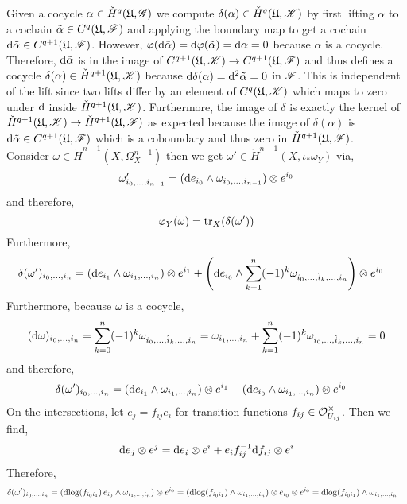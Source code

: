 \documentclass[12pt]{article}
\begin{document}
\begin{enumerate}
Given a cocycle $\alpha \in \check{H}^{q}(\mathfrak{U}, \mathscr{G})$ we compute $\delta(\alpha) \in \check{H}^{q}(\mathfrak{U}, \mathscr{K})$ by first lifting $\alpha$ to a cochain $\tilde{\alpha} \in C^{q}(\mathfrak{U}, \mathscr{F})$ and applying the boundary map to get a cochain $\mathrm{d}{\tilde{\alpha}} \in C^{q+1}(\mathfrak{U}, \mathscr{F})$. However, $\varphi(\mathrm{d}{\tilde{\alpha}}) = \mathrm{d}{\varphi(\tilde{\alpha})} = \mathrm{d}{\alpha} = 0$ because $\alpha$ is a cocycle. Therefore, $\mathrm{d}{\tilde{\alpha}}$ is in the image of $C^{q+1}(\mathfrak{U}, \mathscr{K}) \to C^{q+1}(\mathfrak{U}, \mathscr{F})$ and thus defines a cocycle $\delta(\alpha) \in \check{H}^{q+1}(\mathfrak{U}, \mathscr{K})$ because $\mathrm{d}{\delta(\alpha)} = \mathrm{d}^2{\tilde{\alpha}} = 0$ in $\mathscr{F}$. This is independent of the lift since two lifts differ by an element of $C^{q}(\mathfrak{U}, \mathscr{K})$ which maps to zero under $\mathrm{d}$ inside $\check{H}^{q+1}(\mathfrak{U}, \mathscr{K})$. Furthermore, the image of $\delta$ is exactly the kernel of $\check{H}^{q+1}(\mathfrak{U}, \mathscr{K}) \to \check{H}^{q+1}(\mathfrak{U}, \mathscr{F})$ as expected because the image of $\delta(\alpha)$ is $\mathrm{d}{\tilde{\alpha}} \in C^{q+1}(\mathfrak{U}, \mathscr{F})$ which is a coboundary and thus zero in $\check{H}^{q+1}(\mathfrak{U}, \mathscr{F})$.
\bigskip\\
Consider $\omega \in \check{H}^{n-1}(X, \Omega^{n-1}_X)$ then we get $\omega' \in \check{H}^{n-1}(X, \iota_* \omega_Y)$ via,
\[ \omega'_{i_0, \dots, i_{n-1}} = (\mathrm{d}{e_{i_0}} \wedge \omega_{i_0, \dots, i_{n-1}}) \otimes e^{i_0} \]
and therefore,
\[ \varphi_Y(\omega) = \mathrm{tr}_X(\delta(\omega')) \]
Furthermore,
\begin{align*}
\delta(\omega')_{i_0, \dots, i_n} & = (\mathrm{d}{e_{i_1}} \wedge \omega_{i_1, \dots, i_{n}}) \otimes e^{i_1} + \left( \mathrm{d}{e_{i_0}} \wedge \sum_{k = 1}^n (-1)^k \omega_{i_0, \dots, \hat{i}_k, \dots, i_n} \right) \otimes e^{i_0}
\end{align*}
Furthermore, because $\omega$ is a cocycle, 
\[ (\mathrm{d}{\omega})_{i_0, \dots, i_n} = \sum_{k = 0}^n (-1)^k \omega_{i_0, \dots, \hat{i}_k, \dots, i_n} = \omega_{i_1, \dots, i_n} + \sum_{k = 1}^n (-1)^k \omega_{i_0, \dots, \hat{i}_k, \dots, i_n} = 0 \]
and therefore,
\begin{align*}
\delta(\omega')_{i_0, \dots, i_n} & = (\mathrm{d}{e_{i_1}} \wedge \omega_{i_1, \dots, i_{n}}) \otimes e^{i_1} - (\mathrm{d}{e_{i_0}} \wedge \omega_{i_1, \dots, i_n}) \otimes e^{i_0} 
\end{align*}
On the intersections, let $e_j = f_{ij} e_i$ for transition functions $f_{ij} \in \mathcal{O}_{U_{ij}}^\times$. Then we find,
\[ \mathrm{d}{e_j} \otimes e^j = \mathrm{d}{e_i} \otimes e^i + e_i f_{ij}^{-1} \mathrm{d}{f_{ij}} \otimes e^i \]
Therefore,
\begin{align*}
\delta(\omega')_{i_0, \dots, i_n} & = ( \d{\log}(f_{i_0 i_1}) \, e_{i_0} \wedge \omega_{i_1, \dots, i_n} ) \otimes e^{i_0} = ( \d{\log}(f_{i_0 i_1})  \wedge \omega_{i_1, \dots, i_n} ) \otimes e_{i_0} \otimes e^{i_0} = \d{\log}(f_{i_0 i_1}) \wedge \omega_{i_1, \dots, i_n}

\end{align*}
\end{enumerate}
\end{document}
